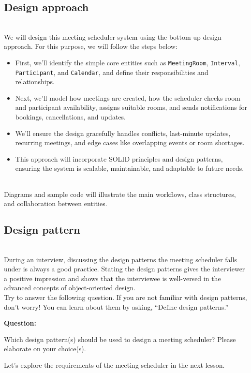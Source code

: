 \subsection{Design approach}\label{FgxX72eGTi7TExvcDCSho}
\\
We will design this meeting scheduler system using the bottom-up design approach. For this purpose, we will follow the steps below:

\begin{itemize}
\item
\protect{}\label{cHCIsn1GX6asIsQACRHgb}
First, we'll identify the simple core entities such as \texttt{MeetingRoom}, \texttt{Interval}, \texttt{Participant}, and \texttt{Calendar}, and define their responsibilities and relationships.
\item
\protect{}\label{a70YXyWljHI9SsVwrCNzB}
Next, we'll model how meetings are created, how the scheduler checks room and participant availability, assigns suitable rooms, and sends notifications for bookings, cancellations, and updates.
\item
\protect{}\label{oFkliksAkD8GFicdDBSPs}
We'll ensure the design gracefully handles conflicts, last-minute updates, recurring meetings, and edge cases like overlapping events or room shortages.
\item
\protect{}\label{5eQRjIuu0f75ulHXRgTZN}
This approach will incorporate SOLID principles and design patterns, ensuring the system is scalable, maintainable, and adaptable to future needs.
\end{itemize}
\\
Diagrams and sample code will illustrate the main workflows, class structures, and collaboration between entities.

\subsection{Design pattern~}\label{EFFv6G5Afm3ipxuO7os5A}
\\
During an interview, discussing the design patterns the meeting scheduler falls under is always a good practice. Stating the design patterns gives the interviewer a positive impression and shows that the interviewee is well-versed in the advanced concepts of object-oriented design.
\\
Try to answer the following question. If you are not familiar with design patterns, don't worry! You can learn about them by asking, ``Define design patterns.''

\textbf{Question:}

Which design pattern(s) should be used to design a meeting scheduler? Please elaborate on your choice(s).

Let's explore the requirements of the meeting scheduler in the next lesson.

